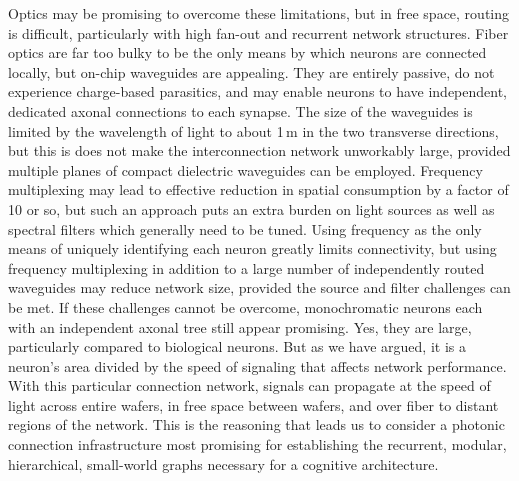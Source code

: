 Optics may be promising to overcome these limitations, but in free space, routing is difficult, particularly with high fan-out and recurrent network structures. Fiber optics are far too bulky to be the only means by which neurons are connected locally, but on-chip waveguides are appealing. They are entirely passive, do not experience charge-based parasitics, and may enable neurons to have independent, dedicated axonal connections to each synapse. The size of the waveguides is limited by the wavelength of light to about 1\,\textmu m in the two transverse directions, but this is does not make the interconnection network unworkably large, provided multiple planes of compact dielectric waveguides can be employed. Frequency multiplexing may lead to effective reduction in spatial consumption by a factor of 10 or so, but such an approach puts an extra burden on light sources as well as spectral filters which generally need to be tuned. Using frequency as the only means of uniquely identifying each neuron greatly limits connectivity, but using frequency multiplexing in addition to a large number of independently routed waveguides may reduce network size, provided the source and filter challenges can be met. If these challenges cannot be overcome, monochromatic neurons each with an independent axonal tree still appear promising. Yes, they are large, particularly compared to biological neurons. But as we have argued, it is a neuron's area divided by the speed of signaling that affects network performance. With this particular connection network, signals can propagate at the speed of light across entire wafers, in free space between wafers, and over fiber to distant regions of the network. This is the reasoning that leads us to consider a photonic connection infrastructure most promising for establishing the recurrent, modular, hierarchical, small-world graphs necessary for a cognitive  architecture. 